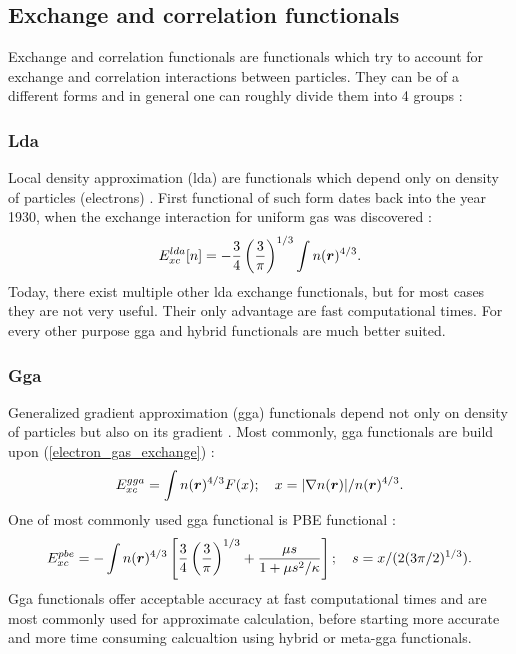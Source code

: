 \documentclass[openany, longbibliography,slovene,a4paper,12pt]{article}
\def\vec#1{\mbox{\boldmath$#1$}}
\begin{document}
\subsection{Exchange and correlation functionals}
Exchange and correlation functionals are functionals which try to account for
exchange and correlation interactions between particles. They can be of a
different forms and in general one can roughly divide them into 4 groups \cite{challenges_den_fun_theor}:

\subsubsection{Lda}
Local density approximation (lda) are functionals which depend only on
density of particles (electrons) \cite{challenges_den_fun_theor}.
First functional of such form dates back into
the year 1930, when the exchange interaction for uniform gas was discovered \cite{challenges_den_fun_theor}:
\begin{equation} \label{electron_gas_exchange}
E_{xc}^{lda}[n]=-\frac{3}{4}\left( \frac{3}{\pi} \right)^{1/3}\int n(\vec r)^{4/3}.
\end{equation}
Today, there exist multiple other lda exchange functionals, but for most cases
they are not very useful. Their only advantage are fast computational times.
For every other purpose gga and hybrid functionals are much better suited.

\subsubsection{Gga}
Generalized gradient approximation (gga) functionals
depend not only on density of particles but also on its gradient \cite{challenges_den_fun_theor}. Most commonly,
gga functionals are build upon (\ref{electron_gas_exchange}) \cite{challenges_den_fun_theor}:
\begin{equation}
  E_{xc}^{gga}=\int n(\vec r)^{4/3}F(x);\quad x=|\nabla n(\vec r)|/n(\vec r)^{4/3}.
\end{equation}
One of most commonly used gga functional is PBE functional
\cite{challenges_den_fun_theor} \cite{challenges_den_fun_theor}:
\begin{equation}
  E_{xc}^{pbe}=-\int  n(\vec r)^{4/3}\left[ \frac{3}{4}\left(\frac{3}{\pi}\right)^{1/3} + \frac{\mu s}{1+ \mu s^2/\kappa} \right]; \quad s=x/(2(3\pi/2)^{1/3}).
\end{equation}
Gga functionals offer acceptable accuracy at fast computational times and are
most commonly used for approximate calculation, before starting more accurate
and more time consuming calcualtion using hybrid or meta-gga functionals.
\end{document}
